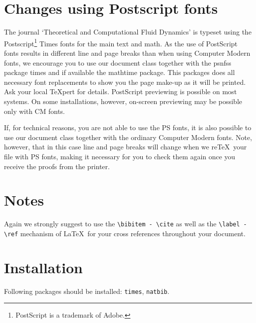 \documentclass[final]{ltxguide}[1995/11/28]
\begin{document}
\section{Changes using Postscript fonts}

The journal `Theoretical and Computational Fluid Dynamics' is typeset using the
Postscript\footnote{PostScript is a trademark of Adobe.} Times fonts for the
main text and math. As the use of PostScript fonts results in different line and page
breaks than when using Computer Modern fonts, we encourage you to use our
document class together with the psnfss package times and if available the
mathtime package. This packages does all necessary font replacements to show
you the page make-up as it will be printed. Ask your local \TeX pert for
details. PostScript previewing is possible on most systems. On some
installations, however, on-screen previewing may be possible only with
CM fonts.

If, for technical reasons, you are not able to use the PS fonts, it is also
possible to use our document class together with the ordinary Computer Modern
fonts. Note, however, that in this case line and page breaks will change when
we re\TeX\ your file with PS fonts, making it necessary for you to check them
again once you receive the proofs from the printer.


\section{Notes}

Again we strongly suggest to use the \verb|\bibitem - \cite| as well as
the \verb|\label -| \verb|\ref| mechanism of \LaTeX\ for your cross
references throughout your document.

\section{Installation}

Following packages should be installed: \verb|times|, \verb|natbib|.
\end{document}
